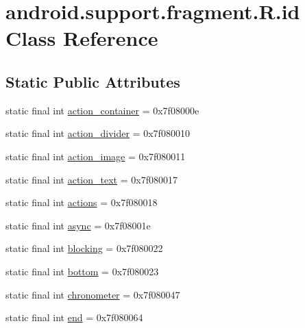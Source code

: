 \hypertarget{classandroid_1_1support_1_1fragment_1_1_r_1_1id}{}\section{android.\+support.\+fragment.\+R.\+id Class Reference}
\label{classandroid_1_1support_1_1fragment_1_1_r_1_1id}
\subsection*{Static Public Attributes}
\begin{DoxyCompactItemize}
\item 
static final int \mbox{\hyperlink{classandroid_1_1support_1_1fragment_1_1_r_1_1id_ad4bec45cf9cff52d520e860a574aa226}{action\+\_\+container}} = 0x7f08000e
\item 
static final int \mbox{\hyperlink{classandroid_1_1support_1_1fragment_1_1_r_1_1id_ad811bb6964dcc433ccc688817648d8be}{action\+\_\+divider}} = 0x7f080010
\item 
static final int \mbox{\hyperlink{classandroid_1_1support_1_1fragment_1_1_r_1_1id_a135eef42157f8f706a6c74f8fcba6134}{action\+\_\+image}} = 0x7f080011
\item 
static final int \mbox{\hyperlink{classandroid_1_1support_1_1fragment_1_1_r_1_1id_afbdd120fa0aabb9a6df0d71b036812c2}{action\+\_\+text}} = 0x7f080017
\item 
static final int \mbox{\hyperlink{classandroid_1_1support_1_1fragment_1_1_r_1_1id_ae14cedff31dc8e6312a5676db60c9646}{actions}} = 0x7f080018
\item 
static final int \mbox{\hyperlink{classandroid_1_1support_1_1fragment_1_1_r_1_1id_ae3f9c73e6d119f64fb24f8073b386d49}{async}} = 0x7f08001e
\item 
static final int \mbox{\hyperlink{classandroid_1_1support_1_1fragment_1_1_r_1_1id_ae4aa5f931fb8f34e17062e5788ea047d}{blocking}} = 0x7f080022
\item 
static final int \mbox{\hyperlink{classandroid_1_1support_1_1fragment_1_1_r_1_1id_aed8539d60469fd437e672768cecede4a}{bottom}} = 0x7f080023
\item 
static final int \mbox{\hyperlink{classandroid_1_1support_1_1fragment_1_1_r_1_1id_a4e681b3334ae6de2690be4150ee81814}{chronometer}} = 0x7f080047
\item 
static final int \mbox{\hyperlink{classandroid_1_1support_1_1fragment_1_1_r_1_1id_af329f6eba3c913f97e6dcc9e0ac0f76b}{end}} = 0x7f080064
\item 

\end{DoxyCompactItemize}
